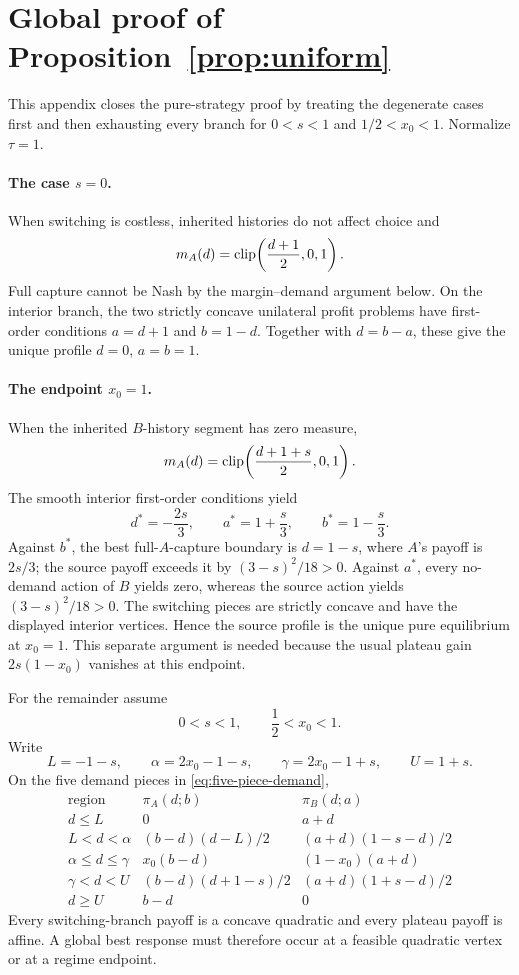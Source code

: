 \section{Global proof of Proposition~\ref{prop:uniform}}
\label{app:uniform-proof}

This appendix closes the pure-strategy proof by treating the degenerate cases first and then exhausting every branch for \(0<s<1\) and \(1/2<x_0<1\). Normalize \(\tau=1\).

\paragraph{The case \(s=0\).}
When switching is costless, inherited histories do not affect choice and
\[
m_A(d)=\operatorname{clip}\!\left(\frac{d+1}{2},0,1\right).
\]
Full capture cannot be Nash by the margin--demand argument below. On the interior branch, the two strictly concave unilateral profit problems have first-order conditions \(a=d+1\) and \(b=1-d\). Together with \(d=b-a\), these give the unique profile \(d=0\), \(a=b=1\).

\paragraph{The endpoint \(x_0=1\).}
When the inherited \(B\)-history segment has zero measure,
\[
m_A(d)=\operatorname{clip}\!\left(\frac{d+1+s}{2},0,1\right).
\]
The smooth interior first-order conditions yield
\[
d^*=-\frac{2s}{3},\qquad
a^*=1+\frac{s}{3},\qquad
b^*=1-\frac{s}{3}.
\]
Against \(b^*\), the best full-\(A\)-capture boundary is \(d=1-s\), where \(A\)'s payoff is \(2s/3\); the source payoff exceeds it by \((3-s)^2/18>0\). Against \(a^*\), every no-demand action of \(B\) yields zero, whereas the source action yields \((3-s)^2/18>0\). The switching pieces are strictly concave and have the displayed interior vertices. Hence the source profile is the unique pure equilibrium at \(x_0=1\). This separate argument is needed because the usual plateau gain \(2s(1-x_0)\) vanishes at this endpoint.

For the remainder assume
\[
0<s<1,\qquad \frac12<x_0<1.
\]
Write
\[
L=-1-s,\qquad
\alpha=2x_0-1-s,\qquad
\gamma=2x_0-1+s,\qquad
U=1+s.
\]
On the five demand pieces in \eqref{eq:five-piece-demand},
\[
\begin{array}{c|c|c}
\text{region} & \pi_A(d;b) & \pi_B(d;a)\\
\hline
d\le L & 0 & a+d\\
L<d<\alpha & (b-d)(d-L)/2 & (a+d)(1-s-d)/2\\
\alpha\le d\le\gamma & x_0(b-d) & (1-x_0)(a+d)\\
\gamma<d<U & (b-d)(d+1-s)/2 & (a+d)(1+s-d)/2\\
d\ge U & b-d & 0
\end{array}
\]
Every switching-branch payoff is a concave quadratic and every plateau payoff is affine. A global best response must therefore occur at a feasible quadratic vertex or at a regime endpoint.

